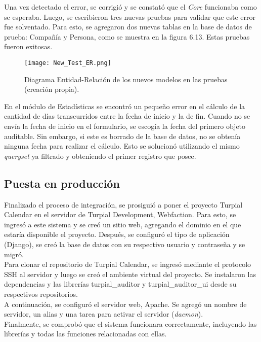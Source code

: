 Una vez detectado el error, se corrigió y se constató que el \textit{Core} funcionaba como se esperaba. Luego, se escribieron tres nuevas pruebas para validar que este error fue solventado. Para esto, se agregaron dos nuevas tablas en la base de datos de prueba: Compañía y Persona, como se muestra en la figura 6.13. Estas pruebas fueron exitosas.\\


\begin{figure}[h]
\centering
\texttt{[image: New\_Test\_ER.png]}
\caption{ Diagrama Entidad-Relación de los nuevos modelos en las pruebas (creación propia).}
\label{fig:figura6.13}
\end{figure}


En el módulo de Estadísticas se encontró un pequeño error en el cálculo de la cantidad de días transcurridos entre la fecha de inicio y la de fin. Cuando no se envía la fecha de inicio en el formulario, se escogía la fecha del primero objeto auditable. Sin embargo, si este es borrado de la base de datos, no se obtenía ninguna fecha para realizar el cálculo. Esto se solucionó utilizando el mismo \textit{queryset} ya filtrado y obteniendo el primer registro que posee.

\subsection{Puesta en producción}

Finalizado el proceso de integración, se prosiguió a poner el proyecto Turpial Calendar en el servidor de Turpial Development, Webfaction. Para esto, se ingresó a este sistema y se creó un sitio web, agregando el dominio en el que estaría disponible el proyecto. Después, se configuró el tipo de aplicación (Django), se creó la base de datos con su respectivo usuario y contraseña y se migró. \\

Para clonar el repositorio de Turpial Calendar, se ingresó mediante el protocolo SSH al servidor y luego se creó el ambiente virtual del proyecto. Se instalaron las dependencias y las librerías turpial\_auditor y turpial\_auditor\_ui desde su respectivos repositorios.\\

A continuación, se configuró el servidor web, Apache. Se agregó un nombre de servidor, un alias y una tarea para activar el servidor (\textit{daemon}). \\

Finalmente, se comprobó que el sistema funcionara correctamente, incluyendo las librerías y todas las funciones relacionadas con ellas.

